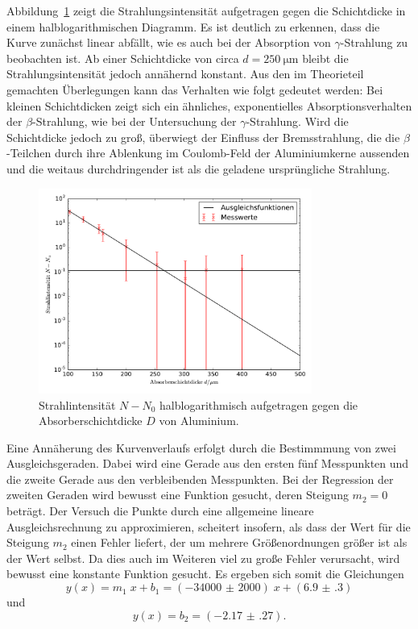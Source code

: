 \documentclass[
  bibliography=totoc,     %
  captions=tableheading,  %
  titlepage=firstiscover, %
]{scrartcl}
\begin{document}
Abbildung~\ref{fig:plot_aluminium} zeigt die Strahlungsintensität
aufgetragen gegen die Schichtdicke in einem halblogarithmischen Diagramm. Es ist
deutlich zu erkennen, dass die Kurve zunächst linear abfällt, wie es auch bei
der Absorption von $\gamma$-Strahlung zu beobachten ist. Ab einer Schichtdicke
von circa $d=\SI{250}{\micro\metre}$ bleibt die Strahlungsintensität jedoch
annähernd konstant. Aus den im Theorieteil gemachten Überlegungen kann das
Verhalten wie folgt gedeutet werden: Bei kleinen Schichtdicken zeigt sich ein
ähnliches, exponentielles Absorptionsverhalten der $\beta$-Strahlung, wie bei
der Untersuchung der $\gamma$-Strahlung. Wird die Schichtdicke jedoch zu groß,
überwiegt der Einfluss der Bremsstrahlung, die die $\beta$-Teilchen durch ihre
Ablenkung im Coulomb-Feld der Aluminiumkerne aussenden und die weitaus
durchdringender ist als die geladene ursprüngliche Strahlung.

\begin{figure}[ht]
    \centering
    \includegraphics[width=0.80\textwidth]{plot_Aluminium.pdf}
    \caption{Strahlintensität $N-N_0$ halblogarithmisch aufgetragen gegen die Absorberschichtdicke $D$ von Aluminium.}
    \label{fig:plot_aluminium}
\end{figure}

Eine Annäherung des Kurvenverlaufs erfolgt durch die Bestimmmung von zwei
Ausgleichsgeraden. Dabei wird eine Gerade aus den ersten fünf Messpunkten und
die zweite Gerade aus den verbleibenden Messpunkten. Bei der Regression der
zweiten Geraden wird bewusst eine Funktion gesucht, deren Steigung $m_2=0$
beträgt. Der Versuch die Punkte durch eine allgemeine lineare Ausgleichsrechnung
zu approximieren, scheitert insofern, als dass der Wert für die Steigung $m_2$
einen Fehler liefert, der um mehrere Größenordnungen größer ist als der Wert
selbst. Da dies auch im Weiteren viel zu große Fehler verursacht, wird bewusst
eine konstante Funktion gesucht. Es ergeben sich somit die Gleichungen
%
\begin{equation}
    y(x) = m_1\;x+b_1 = (\num{-34000(2000)})\;x+(\num{6.9(3)})
    \label{eq:geradengleichung_aluminium_1}
\end{equation}
%
und
%
\begin{equation}
    y(x) = b_2 = (\num{-2.17(27)}).
    \label{eq:geradengleichung_aluminium_2}
\end{equation}
\end{document}

